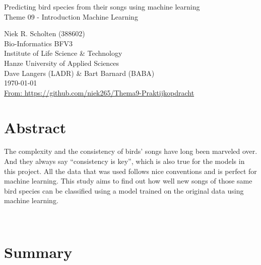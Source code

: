 \documentclass[
]{article}
\begin{document}
\null
\thispagestyle{empty}
\addtocounter{page}{-1}
\newpage

\begin{center}


    \Huge{Predicting bird species from their songs using machine learning}\\
    \vspace{\baselineskip}
    \LARGE{Theme 09 - Introduction Machine Learning}\\
    \vspace{\baselineskip}

\end{center}
\vspace{\baselineskip}

\normalsize
\vspace*{\fill}
\begin{flushright}
    Niek R. Scholten (388602)\\
    Bio-Informatics BFV3\\
    Institute of Life Science \& Technology\\
    Hanze University of Applied Sciences\\
    Dave Langers (LADR) \& Bart Barnard (BABA)\\
    \today\\
    \href{https://github.com/niek265/Thema9-Praktijkopdracht}{From: https://github.com/niek265/Thema9-Praktijkopdracht}
\end{flushright}
\newpage

\section*{Abstract}

The complexity and the consistency of birds' songs have long been marveled over.
And they always say ``consistency is key'', which is also true for the models in this project.
All the data that was used follows nice conventions and is perfect for machine learning.
This study aims to find out how well new songs of those same bird species can be classified using a model trained on the original data using machine learning.

\label{sec:abstract}~
\newpage

\section*{Summary}
\end{document}
